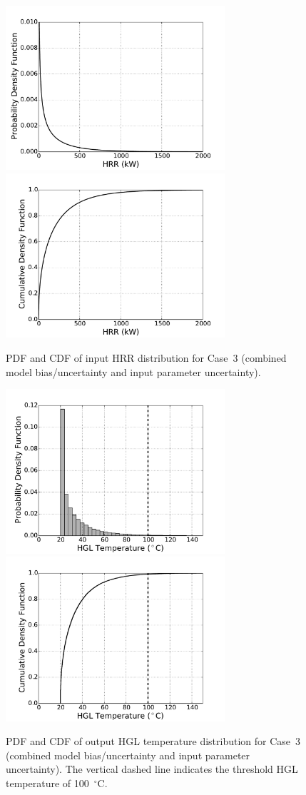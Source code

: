 \documentclass[12pt]{article}
\begin{document}
\begin{figure}[p]
\includegraphics[width=3.2in]{Figures/input_PDF}
\includegraphics[width=3.2in]{Figures/input_CDF}
\caption{PDF and CDF of input HRR distribution for Case~3 (combined model bias/uncertainty and input parameter uncertainty).}
\label{fig:case_3_input_distributions}
\end{figure}

\begin{figure}[p]
\includegraphics[width=3.2in]{Figures/output_PDF_3_combined}
\includegraphics[width=3.2in]{Figures/output_CDF_3_combined}
\caption{PDF and CDF of output HGL temperature distribution for Case~3 (combined model bias/uncertainty and input parameter uncertainty). The vertical dashed line indicates the threshold HGL temperature of 100~$^\circ$C.}
\label{fig:case_3_output_distributions}
\end{figure}
\end{document}
